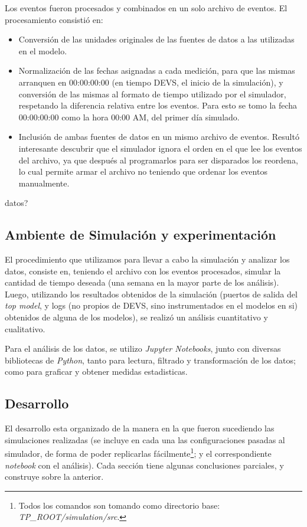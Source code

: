 Los eventos fueron procesados y combinados en un solo archivo de eventos. El
procesamiento consistió en: \begin{itemize} \item Conversión de las unidades
originales de las fuentes de datos a las utilizadas en el modelo. \item
Normalización de las fechas asignadas a cada medición, para que las mismas
arranquen en 00:00:00:00 (en tiempo DEVS, el inicio de la simulación), y
conversión de las mismas al formato de tiempo utilizado por el simulador,
respetando la diferencia relativa entre los eventos. Para esto se tomo la
fecha 00:00:00:00 como la hora 00:00 AM, del primer día simulado. \item
Inclusión de ambas fuentes de datos en un mismo archivo de eventos. Resultó
interesante descubrir que el simulador ignora el orden en el que lee los
eventos del archivo, ya que después al programarlos para ser disparados los
reordena, lo cual permite armar el archivo no teniendo que ordenar los
eventos manualmente. \end{itemize} %
datos?

\subsection{Ambiente de Simulación y experimentación} El procedimiento que
utilizamos para llevar a cabo la simulación y analizar los datos, consiste
en, teniendo el archivo con los eventos procesados, simular la cantidad de
tiempo deseada (una semana en la mayor parte de los análisis). Luego,
utilizando los resultados obtenidos de la simulación (puertos de salida del
\textit{top model}, y logs (no propios de DEVS, sino instrumentados en el
modelos en si) obtenidos de alguna de los modelos), se realizó un análisis
cuantitativo y cualitativo.

Para el análisis de los datos, se utilizo \textit{Jupyter Notebooks}, junto
con diversas bibliotecas de \textit{Python}, tanto para lectura, filtrado y
transformación de los datos; como para graficar y obtener medidas
estadisticas.

\subsection{Desarrollo} El desarrollo esta organizado de la manera en la que
fueron sucediendo las simulaciones realizadas (se incluye en cada una las
configuraciones pasadas al simulador, de forma de poder replicarlas
fácilmente\footnote{Todos los comandos son tomando como directorio base: \textit{TP\_ROOT/simulation/src}.}; y el correspondiente \textit{notebook} con el análisis). Cada
sección tiene algunas conclusiones parciales, y construye sobre la anterior.

